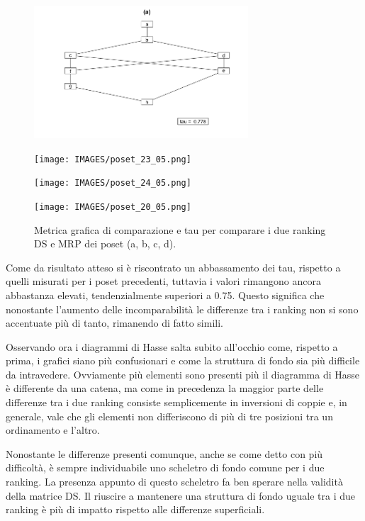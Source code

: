 \documentclass{report}
\begin{document}
\begin{figure}[H]
  \centering
  \begin{minipage}[b]{0.4\textwidth}
    \includegraphics[width=8cm]{IMAGES/poset_17_05.png}
  \end{minipage}
  \hfill
  \begin{minipage}[b]{0.4\textwidth}
    \texttt{[image: IMAGES/poset\_23\_05.png]}
  \end{minipage}
  \hfill
  \begin{minipage}[b]{0.4\textwidth}
    \texttt{[image: IMAGES/poset\_24\_05.png]}
  \end{minipage}
  \hfill
  \begin{minipage}[b]{0.4\textwidth}
    \texttt{[image: IMAGES/poset\_20\_05.png]}
  \end{minipage}
  \caption{Metrica grafica di comparazione e tau per comparare i due ranking DS e MRP dei poset (a, b, c, d).}
\end{figure}

Come da risultato atteso si è riscontrato un abbassamento dei tau, rispetto a quelli misurati per i poset precedenti, tuttavia i valori rimangono ancora abbastanza elevati, tendenzialmente superiori a 0.75. Questo significa che nonostante l'aumento delle incomparabilità le differenze tra i ranking non si sono accentuate più di tanto, rimanendo di fatto simili. 


Osservando ora i diagrammi di Hasse salta subito all'occhio come, rispetto a prima, i grafici siano più confusionari e come la struttura di fondo sia più difficile da intravedere. Ovviamente più elementi sono presenti più il diagramma di Hasse è differente da una catena, ma come in precedenza la maggior parte delle differenze tra i due ranking consiste semplicemente in inversioni di coppie e, in generale, vale che gli elementi non differiscono di più di tre posizioni tra un ordinamento e l'altro.


Nonostante le differenze presenti comunque, anche se come detto con più difficoltà, è sempre individuabile uno scheletro di fondo comune per i due ranking. La presenza appunto di questo scheletro fa ben sperare nella validità della matrice DS. Il riuscire a mantenere una struttura di fondo uguale tra i due ranking è più di impatto rispetto alle differenze superficiali.
\end{document}
